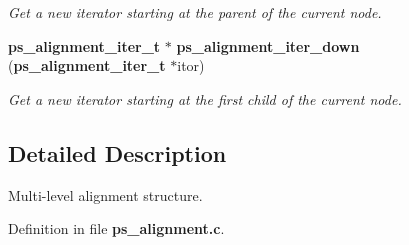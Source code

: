 \begin{DoxyCompactItemize}
\begin{DoxyCompactList}\small\item\em Get a new iterator starting at the parent of the current node. \end{DoxyCompactList}\item 
{\bf ps\-\_\-alignment\-\_\-iter\-\_\-t} $\ast$ {\bf ps\-\_\-alignment\-\_\-iter\-\_\-down} ({\bf ps\-\_\-alignment\-\_\-iter\-\_\-t} $\ast$itor)\label{ps__alignment_8c_a6356f643a01e2071c6f00f8a5d56565a}

\begin{DoxyCompactList}\small\item\em Get a new iterator starting at the first child of the current node. \end{DoxyCompactList}\end{DoxyCompactItemize}


\subsection{Detailed Description}
Multi-\/level alignment structure. 

Definition in file {\bf ps\-\_\-alignment.\-c}.

